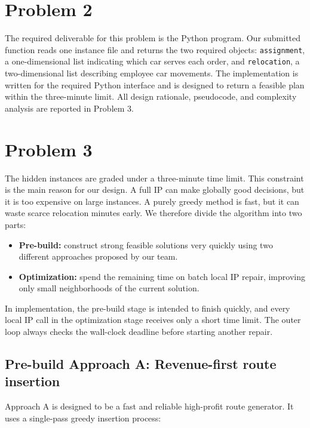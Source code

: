 \documentclass[10pt,a4paper]{article}
\begin{document}
\newpage

\section*{Problem 2}

The required deliverable for this problem is the Python program.  Our submitted
function reads one instance file and returns the two required objects:
\texttt{assignment}, a one-dimensional list indicating which car serves each
order, and \texttt{relocation}, a two-dimensional list describing employee car
movements.  The implementation is written for the required Python interface and
is designed to return a feasible plan within the three-minute limit.  All design
rationale, pseudocode, and complexity analysis are reported in Problem 3.


\section*{Problem 3}

The hidden instances are graded under a three-minute time limit.  This constraint
is the main reason for our design.  A full IP can make globally good decisions,
but it is too expensive on large instances.  A purely greedy method is fast, but
it can waste scarce relocation minutes early.  We therefore divide the algorithm
into two parts:

\begin{itemize}
    \item \textbf{Pre-build:} construct strong feasible solutions very quickly
    using two different approaches proposed by our team.
    \item \textbf{Optimization:} spend the remaining time on batch local IP
    repair, improving only small neighborhoods of the current solution.
\end{itemize}
In implementation, the pre-build stage is intended to finish quickly, and every
local IP call in the optimization stage receives only a short time limit.  The
outer loop always checks the wall-clock deadline before starting another repair.

\subsection*{Pre-build Approach A: Revenue-first route insertion}

Approach A is designed to be a fast and reliable high-profit route generator. It
uses a single-pass greedy insertion process:
\end{document}
